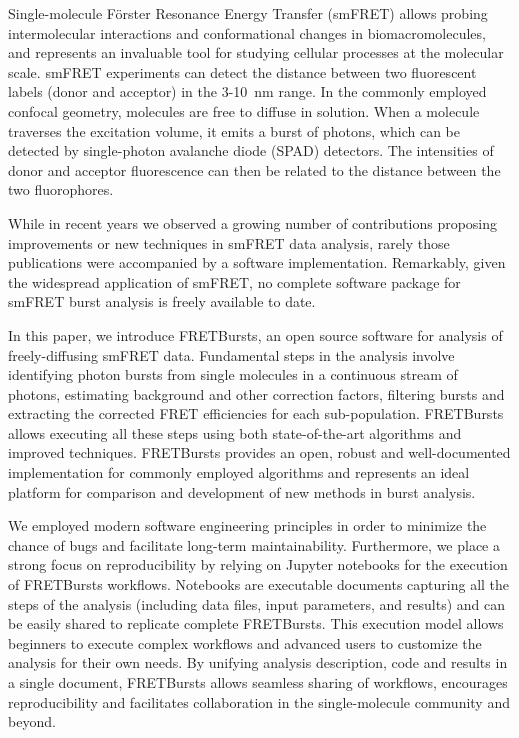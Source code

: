 Single-molecule Förster Resonance Energy Transfer (smFRET) allows
probing intermolecular interactions and conformational changes in
biomacromolecules, and represents an invaluable tool for studying
cellular processes at the molecular scale. smFRET experiments can
detect the distance between two fluorescent labels (donor and acceptor)
in the 3-10~nm range. In the commonly employed confocal geometry,
molecules are free to diffuse in solution. When a molecule traverses
the excitation volume, it emits a burst of photons, which can be detected
by single-photon avalanche diode (SPAD) detectors. The intensities of
donor and acceptor fluorescence can then be related to the distance
between the two fluorophores.

While in recent years we observed a growing number of contributions
proposing improvements or new techniques in smFRET data analysis,
rarely those publications were accompanied by a software implementation.
Remarkably, given the widespread application of smFRET, no complete
software package for smFRET burst analysis is freely available to date.

In this paper, we introduce FRETBursts, an open source software
for analysis of freely-diffusing smFRET data.
Fundamental steps in the analysis involve identifying photon bursts
from single molecules in a continuous stream of photons, estimating
background and other correction factors, filtering bursts and extracting
the corrected FRET efficiencies for each sub-population.
FRETBursts allows executing all these steps using both state-of-the-art
algorithms and improved techniques.
FRETBursts provides an open, robust and well-documented
implementation for commonly employed algorithms and represents
an ideal platform for comparison and development of new methods
in burst analysis.

We employed modern software engineering principles in order to
minimize the chance of bugs and facilitate long-term maintainability.
Furthermore, we place a strong focus on reproducibility by relying on
Jupyter notebooks for the execution of FRETBursts workflows.
Notebooks are executable documents capturing all the steps of the
analysis (including data files, input parameters, and results) and can
be easily shared to replicate complete FRETBursts.
This execution model allows beginners to execute complex workflows
and advanced users to customize the analysis for their own needs.
By unifying analysis description, code and results in a single document, 
FRETBursts allows seamless sharing of workflows, encourages
reproducibility and facilitates collaboration in the 
single-molecule community and beyond.
